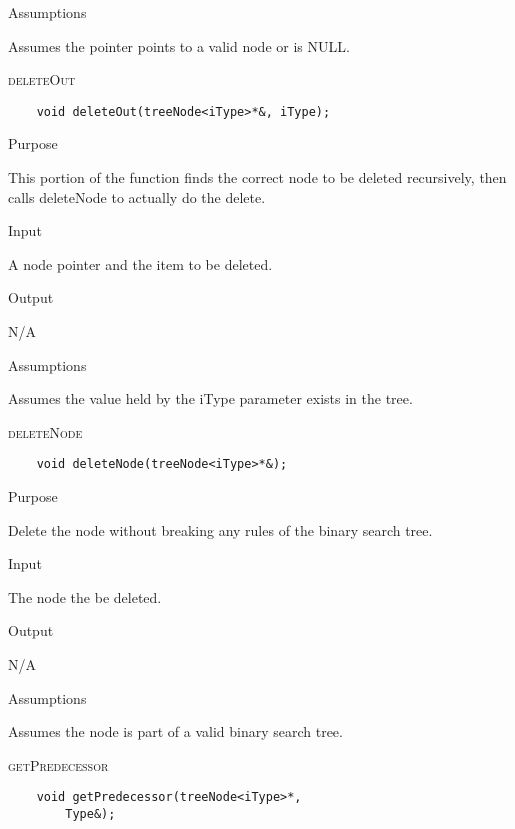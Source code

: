 \documentclass[pdftex, 12pt]{article}
\begin{document}
\begin{description}
\begin{description}
			\item{Assumptions}

				Assumes the pointer points to a valid node or is NULL.

		\end{description}
	\item{\textsc{deleteOut}}
\begin{lstlisting}
	void deleteOut(treeNode<iType>*&, iType);
\end{lstlisting}
		\begin{description}

			\item{Purpose}

				This portion of the function finds the correct node to be deleted recursively, then calls deleteNode to
				actually do the delete.

			\item{Input}

				A node pointer and the item to be deleted.

			\item{Output}

				N/A

			\item{Assumptions}

				Assumes the value held by the iType parameter exists in the tree.

		\end{description}
	\item{\textsc{deleteNode}}
\begin{lstlisting}
	void deleteNode(treeNode<iType>*&);
\end{lstlisting}
		\begin{description}

			\item{Purpose}

				Delete the node without breaking any rules of the binary search tree.

			\item{Input}

				The node the be deleted.

			\item{Output}

				N/A

			\item{Assumptions}

				Assumes the node is part of a valid binary search tree.

		\end{description}
	\item{\textsc{getPredecessor}}
\begin{lstlisting}
	void getPredecessor(treeNode<iType>*, 
		Type&);
\end{lstlisting}
		\begin{description}


\end{description}
\end{description}
\end{document}
